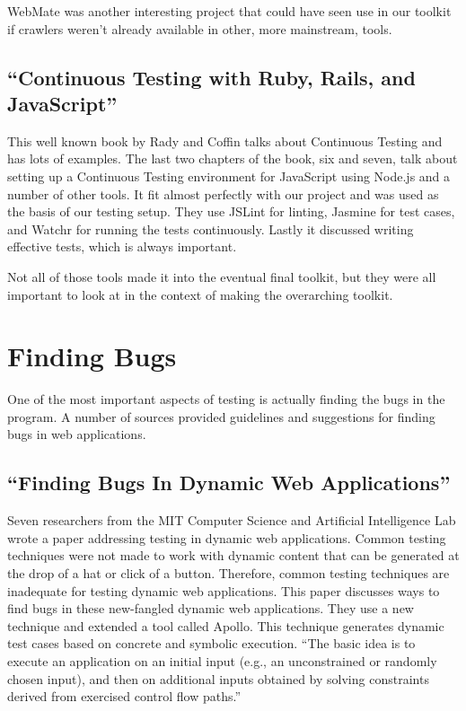 \documentclass[12pt]{ucthesis}
\begin{document}
WebMate was another interesting project that could have seen use in our toolkit if crawlers weren't already available in other, more mainstream, tools.

\subsection{``Continuous Testing with Ruby, Rails, and JavaScript''}
This well known book by Rady and Coffin\cite{BookContinuousTesting} talks about Continuous Testing and has lots of examples. The last two chapters of the book, six and seven, talk about setting up a Continuous Testing environment for JavaScript using Node.js and a number of other tools. It fit almost perfectly with our project and was used as the basis of our testing setup. They use JSLint for linting, Jasmine for test cases, and Watchr for running the tests continuously. Lastly it discussed writing effective tests, which is always important.

Not all of those tools made it into the eventual final toolkit, but they were all important to look at in the context of making the overarching toolkit.

\section{Finding Bugs}
One of the most important aspects of testing is actually finding the bugs in the program. A number of sources provided guidelines and suggestions for finding bugs in web applications.

\subsection{``Finding Bugs In Dynamic Web Applications''}
Seven researchers from the MIT Computer Science and Artificial Intelligence Lab wrote a paper addressing testing in dynamic web applications\cite{FindingBugs}. Common testing techniques were not made to work with dynamic content that can be generated at the drop of a hat or click of a button. Therefore, common testing techniques are inadequate for testing dynamic web applications. This paper discusses ways to find bugs in these new-fangled dynamic web applications. They use a new technique and extended a tool called Apollo. This technique generates dynamic test cases based on concrete and symbolic execution. ``The basic idea is to execute an application on an initial input (e.g., an unconstrained or randomly chosen input), and then on additional inputs obtained by solving constraints derived from exercised control flow paths.''
\end{document}

